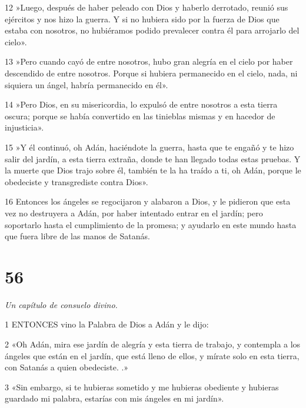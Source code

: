\par 12 »Luego, después de haber peleado con Dios y haberlo derrotado, reunió sus ejércitos y nos hizo la guerra. Y si no hubiera sido por la fuerza de Dios que estaba con nosotros, no hubiéramos podido prevalecer contra él para arrojarlo del cielo».

\par 13 »Pero cuando cayó de entre nosotros, hubo gran alegría en el cielo por haber descendido de entre nosotros. Porque si hubiera permanecido en el cielo, nada, ni siquiera un ángel, habría permanecido en él».

\par 14 »Pero Dios, en su misericordia, lo expulsó de entre nosotros a esta tierra oscura; porque se había convertido en las tinieblas mismas y en hacedor de injusticia».

\par 15 »Y él continuó, oh Adán, haciéndote la guerra, hasta que te engañó y te hizo salir del jardín, a esta tierra extraña, donde te han llegado todas estas pruebas. Y la muerte que Dios trajo sobre él, también te la ha traído a ti, oh Adán, porque le obedeciste y transgrediste contra Dios».

\par 16 Entonces los ángeles se regocijaron y alabaron a Dios, y le pidieron que esta vez no destruyera a Adán, por haber intentado entrar en el jardín; pero soportarlo hasta el cumplimiento de la promesa; y ayudarlo en este mundo hasta que fuera libre de las manos de Satanás.

\chapter{56}

\par \textit{Un capítulo de consuelo divino.}

\par 1 ENTONCES vino la Palabra de Dios a Adán y le dijo:

\par 2 «Oh Adán, mira ese jardín de alegría y esta tierra de trabajo, y contempla a los ángeles que están en el jardín, que está lleno de ellos, y mírate solo en esta tierra, con Satanás a quien obedeciste. .»

\par 3 «Sin embargo, si te hubieras sometido y me hubieras obediente y hubieras guardado mi palabra, estarías con mis ángeles en mi jardín».

